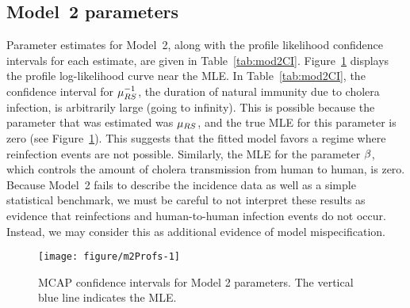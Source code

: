 \subsection{Model~2 parameters}

Parameter estimates for Model~2, along with the profile likelihood confidence intervals for each estimate, are given in Table~\ref{tab:mod2CI}.
Figure~\ref{fig:m2Profs} displays the profile log-likelihood curve near the MLE.
In Table~\ref{tab:mod2CI}, the confidence interval for $\mu_{RS}^{-1}$, the duration of natural immunity due to cholera infection, is arbitrarily large (going to infinity).
This is possible because the parameter that was estimated was $\mu_{RS}$, and the true MLE for this parameter is zero (see Figure~\ref{fig:m2Profs}).
This suggests that the fitted model favors a regime where reinfection events are not possible.
Similarly, the MLE for the parameter $\beta$, which controls the amount of cholera transmission from human to human, is zero.
Because Model~2 fails to describe the incidence data as well as a simple statistical benchmark, we must be careful to not interpret these results as evidence that reinfections and human-to-human infection events do not occur.
Instead, we may consider this as additional evidence of model mispecification.



\begin{figure}[ht]
\begin{knitrout}
\color{fgcolor}

{\centering \texttt{[image: figure/m2Profs-1]} 

}


\end{knitrout}
\caption[MCAP confidence intervals for Model 2 parameters.]{\label{fig:m2Profs}MCAP confidence intervals for Model 2 parameters. The vertical blue line indicates the MLE.}
\end{figure}

